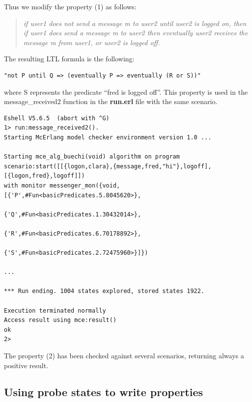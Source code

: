 \documentclass[a4paper]{article}
\begin{document}
Thus we modify the property (1) as follows:
\begin{quote}
\em 
if user1 does not send a message m to user2 until user2 is logged on,
then if user1 does send a message m to user2 then eventually user2
receives the message m from user1, or user2 is logged off.
\end{quote}
The resulting LTL formula is the following:

\begin{verbatim}
"not P until Q => (eventually P => eventually (R or S))"
\end{verbatim}


where S represents the predicate ``fred is logged off''. This property
is used in the message\_received2 function in the {\bf run.erl} file with
the same scenario.

\begin{verbatim}
Eshell V5.6.5  (abort with ^G)
1> run:message_received2().
Starting McErlang model checker environment version 1.0 ...

Starting mce_alg_buechi(void) algorithm on program
scenario:start([[{logon,clara},{message,fred,"hi"},logoff],[{logon,fred},logoff]])
with monitor messenger_mon({void,[{'P',#Fun<basicPredicates.5.8045620>},
                                  {'Q',#Fun<basicPredicates.1.30432014>},
                                  {'R',#Fun<basicPredicates.6.70178892>},
                                  {'S',#Fun<basicPredicates.2.72475960>}]})

...

*** Run ending. 1004 states explored, stored states 1922.

Execution terminated normally
Access result using mce:result()
ok
2> 

\end{verbatim}

The property (2) has been checked against several scenarios, returning
always a positive result.


\subsection{Using probe states to write properties}
\end{document}
